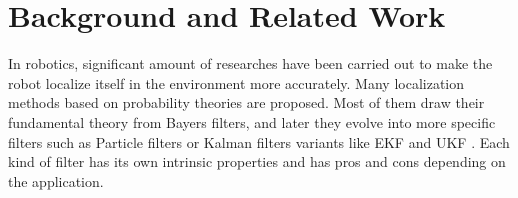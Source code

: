 \chapter{Background and Related Work\label{cha:chapter2}}

In robotics, significant amount of researches have been carried out to make the robot localize itself in the environment more accurately. Many localization methods based on probability theories are proposed. Most of them draw their fundamental theory from Bayers filters, and later they evolve into more specific filters such as Particle filters \cite{dellaert1999monte} or Kalman filters \cite{kalman1960new} variants like \gls{EKF} \cite{julier1997new} and \gls{UKF} \cite{van2001square}. Each kind of filter has its own intrinsic properties and has pros and cons depending on the application.

